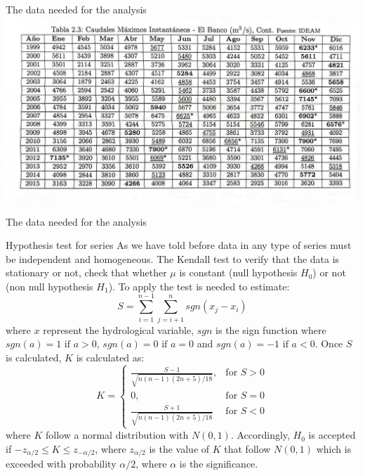 \documentclass[8pt]{beamer}
\renewcommand{\emph}[1]{\textcolor{myorange}{#1}}
\begin{document}
\begin{frame}{The data needed for the analysis}
\centering
\includegraphics[width=\linewidth]{taM23.jpg}  %
\end{frame}

\begin{frame}{The data needed for the analysis}
    \begin{block}{Hypothesis test for series}
        As we have told before data in any type of series must be \emph{independent and homogeneous}. The \emph{Kendall test} to verify that the data is stationary or not, check that whether $\mu$ is constant (\emph{null hypothesis} $H_0$)  or not (\emph{non null hypothesis} $H_1$). To apply the test is needed to estimate:
        \[
            S = \sum_{i=1}^{n-1} \sum_{j=i+1}^n sgn(x_j - x_i)
        \]
        where $x$ represent the hydrological variable, $sgn$ is the sign function where $sgn(a) = 1 \text{ if } a>0$, $sgn(a) = 0 \text{ if } a=0$ and $sgn(a) = -1 \text{ if } a<0$. Once $S$ is calculated, $K$ is calculated as:
 \[
K =
\begin{cases}
    \frac{S-1}{\sqrt{n(n-1) (2n+5)/18}}, & \text{for } S > 0  \\
     0 , & \text{for } S = 0  \\
    \frac{S+1}{\sqrt{n(n-1) (2n+5)/18}} & \text{for } S < 0
\end{cases}
\]
where $K$ follow a \emph{normal distribution} with $N(0,1)$. Accordingly, $H_0$ is accepted if $-z_{\alpha/2} \leq K \leq z_{-\alpha/2}$, where $z_{\alpha/2}$ is the value of $K$ that follow $N(0,1)$ which is exceeded with probability $\alpha/2$, where $\alpha$ is the significance. 
   \end{block}
\end{frame}
\end{document}
